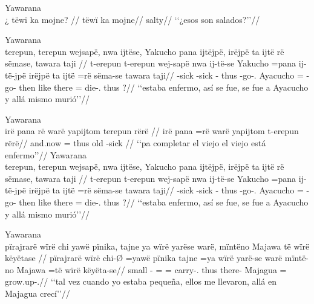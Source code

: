 \documentclass{memoir}
\begin{document}
\ex Yawarana \\
\label{perm-q-advpred-nsubj}    \begingl
    \glpreamble ¿ tëwï ka mojne? //
    \gla tëwï ka mojne//
    \glb {}  salty//
        \glft ‘‘¿esos son salados?’’//  
    \endgl 
\xe

\ex Yawarana \\
\label{temp-aff-npred-cop}    \begingl
    \glpreamble terepun, terepun wejsapë, nwa ijtëse, Yakucho pana ijtëjpë, irëjpë ta ijtë rë sëmase, tawara taji //
    \gla t-erepun t-erepun wej-sapë nwa ij-të-se Yakucho =pana ij-të-jpë irëjpë ta ijtë =rë sëma-se tawara taji//
    \glb {}-sick -sick - thus -go-. Ayacucho = -go- then like there = die-. thus ?//
        \glft ‘‘estaba enfermo, así se fue, se fue a Ayacucho y allá mismo murió’’//  
    \endgl 
\xe

\pex\label{temp-aff-npred-nsubj}    \a Yawarana\\
    \label{desccasmaj-85}        \begingl
        \glpreamble irë pana rë warë yapijtom terepun rërë //
        \gla irë pana =rë warë yapijtom t-erepun rërë//
        \glb and.now = thus old -sick //
            \glft ‘‘pa completar el viejo el viejo está enfermo’’//  
        \endgl 
    \a Yawarana\\
    \label{conv1stenc-99}        \begingl
        \glpreamble terepun, terepun wejsapë, nwa ijtëse, Yakucho pana ijtëjpë, irëjpë ta ijtë rë sëmase, tawara taji //
        \gla t-erepun t-erepun wej-sapë nwa ij-të-se Yakucho =pana ij-të-jpë irëjpë ta ijtë =rë sëma-se tawara taji//
        \glb {}-sick -sick - thus -go-. Ayacucho = -go- then like there = die-. thus ?//
            \glft ‘‘estaba enfermo, así se fue, se fue a Ayacucho y allá mismo murió’’//  
        \endgl 
\xe

\ex Yawarana \\
\label{temp-aff-npred-nsubj-cop}    \begingl
    \glpreamble pïrajrarë wïrë chi yawë pïnika, tajne ya wïrë yarëse warë, mïntëno Majawa të wïrë këyëtase //
    \gla pïrajrarë wïrë chi-Ø =yawë pïnika tajne =ya wïrë yarë-se warë mïntë-no Majawa =të wïrë këyëta-se//
    \glb small  - =   =  carry-. thus there- Majagua =  grow.up-.//
        \glft ‘‘tal vez cuando yo estaba pequeña, ellos me llevaron, allá en Majagua crecí’’//  
    \endgl 
\xe
\end{document}
